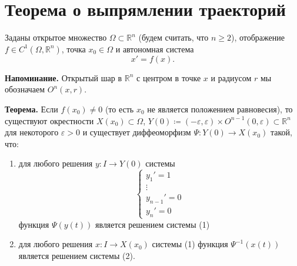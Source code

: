 \setcounter{equation}{0}
\section{Теорема о выпрямлении траекторий}
Заданы открытое множество $\Omega \subset \mathbb R^n$ (будем считать, что $n \geq 2$), отображение $f \in C^1(\Omega, \mathbb R^n)$, точка $x_0 \in \Omega$ и автономная система
\begin{equation}
    x' = f(x).
\end{equation}

\textbf{Напоминание.} Открытый шар в $\mathbb{R}^n$ с центром в точке $x$ и радиусом $r$ мы обозначаем $O^n(x, r)$.

\textbf{Теорема.} Если $f(x_0) \ne 0$ (то есть $x_0$ не является положением равновесия), то существуют окрестности $X(x_0) \subset \Omega$, $Y(0) \coloneq (-\varepsilon, \varepsilon) \times O^{n-1}(0, \varepsilon) \subset \mathbb{R}^n$ для некоторого $\varepsilon > 0$ и существует диффеоморфизм $\Psi\colon Y(0) \to X(x_0)$ такой, что:
\begin{enumerate}
    \item для любого решения $y\colon I \to Y(0)$ системы
    \begin{equation}
        \begin{cases}
            y_1' = 1 \\
            \vdots \\
            y_{n-1}' = 0 \\
            y_n' = 0
        \end{cases}
    \end{equation}
    функция $\Psi(y(t))$ является решением системы (1)
    \item для любого решения $x\colon I \to X(x_0)$ системы (1) функция $\Psi^{-1}(x(t))$ является решением системы (2).
\end{enumerate}

